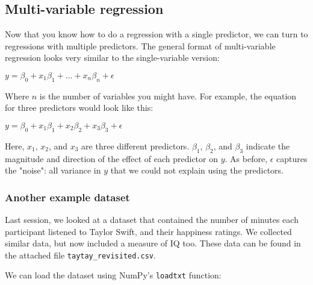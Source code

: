 \documentclass[11pt]{article}
\begin{document}
    \subsection{Multi-variable regression}\label{multi-variable-regression}

Now that you know how to do a regression with a single predictor, we can
turn to regressions with multiple predictors. The general format of
multi-variable regression looks very similar to the single-variable
version:

\(y = \beta_{0} + x_{1} \beta_{1} + ... + x_{n} \beta_{n} + \epsilon\)

Where \(n\) is the number of variables you might have. For example, the
equation for three predictors would look like this:

\(y = \beta_{0} + x_{1} \beta_{1} + x_{2} \beta_{2} + x_{3} \beta_{3} + \epsilon\)

Here, \(x_{1}\), \(x_{2}\), and \(x_{3}\) are three different
predictors. \(\beta_{1}\), \(\beta_{2}\), and \(\beta_{3}\) indicate the
magnitude and direction of the effect of each predictor on \(y\). As
before, \(\epsilon\) captures the "noise": all variance in \(y\) that we
could not explain using the predictors.

    \subsubsection{Another example dataset}\label{another-example-dataset}

Last session, we looked at a dataset that contained the number of
minutes each participant listened to Taylor Swift, and their happiness
ratings. We collected similar data, but now included a measure of IQ
too. These data can be found in the attached file
\texttt{taytay\_revisited.csv}.

We can load the dataset using NumPy's \texttt{loadtxt} function:
\end{document}
